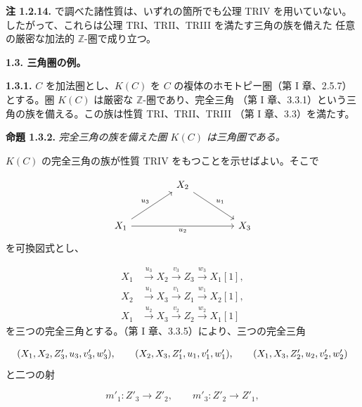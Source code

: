 
\clearpage
{}%
\begingroup
\small
\setlength{\emergencystretch}{1.5em}%
\setlength{\abovedisplayskip}{4pt plus 2pt minus 2pt}%
\setlength{\belowdisplayskip}{4pt plus 2pt minus 2pt}%

\noindent\textbf{注 1.2.14.} で調べた諸性質は、いずれの箇所でも公理 TRIV を用いていない。
したがって、これらは公理 TRI、TRII、TRIII を満たす三角の族を備えた
任意の厳密な加法的 $\mathbb Z$-圏で成り立つ。

\medskip
\noindent\textbf{1.3. 三角圏の例。}

\medskip
\noindent\textbf{1.3.1.}\quad
$C$ を加法圏とし、$K(C)$ を $C$ の複体のホモトピー圏（第 I 章、2.5.7）
とする。圏 $K(C)$ は厳密な $\mathbb Z$-圏であり、完全三角
（第 I 章、3.3.1）という三角の族を備える。この族は性質 TRI、TRII、TRIII
（第 I 章、3.3）を満たす。

\medskip
\noindent\textbf{命題 1.3.2.}\quad
\textit{完全三角の族を備えた圏 $K(C)$ は三角圏である。}

$K(C)$ の完全三角の族が性質 TRIV をもつことを示せばよい。そこで

\[
  \begin{tikzcd}[column sep=4.2em,row sep=2.6em]
    & X_2 \arrow[dr,"u_1"] & \\
    X_1 \arrow[ur,"u_3"] \arrow[rr,"u_2"'] && X_3
  \end{tikzcd}
\]
\noindent を可換図式とし、

\[
  \begin{aligned}
    X_1&\xrightarrow{u_3}X_2\xrightarrow{v_3}Z_3
      \xrightarrow{w_3}X_1[1],\\
    X_2&\xrightarrow{u_1}X_3\xrightarrow{v_1}Z_1
      \xrightarrow{w_1}X_2[1],\\
    X_1&\xrightarrow{u_2}X_3\xrightarrow{v_2}Z_2
      \xrightarrow{w_2}X_1[1]
  \end{aligned}
\]
\noindent を三つの完全三角とする。（第 I 章、3.3.5）により、三つの完全三角

\[
  \resizebox{0.98\linewidth}{!}{$
    (X_1,X_2,Z'_3,u_3,v'_3,w'_3),\qquad
    (X_2,X_3,Z'_1,u_1,v'_1,w'_1),\qquad
    (X_1,X_3,Z'_2,u_2,v'_2,w'_2)
  $}
\]
\noindent と二つの射

\[
  m'_1\colon Z'_3\longrightarrow Z'_2,\qquad
  m'_3\colon Z'_2\longrightarrow Z'_1,
\]
\endgroup


